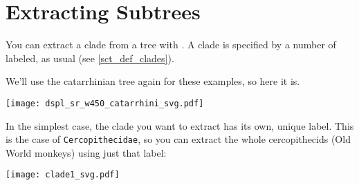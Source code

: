 

\section{Extracting Subtrees}
\label{sct_subtrees}

You can extract a clade from a tree with \clade. A clade is specified by a
number of labeled, as usual (see \ref{sct_def_clades}).

We'll use the catarrhinian tree again for these examples, so here it is.

\begin{center}
\texttt{[image: dspl\_sr\_w450\_catarrhini\_svg.pdf]}
\end{center}

 In the simplest case, the clade you want to extract has its own, unique label.
This is the case of \texttt{Cercopithecidae}, so you can extract the whole
cercopithecids (Old World monkeys) using just that label:


\begin{center}
  \texttt{[image: clade1\_svg.pdf]}
\end{center}
